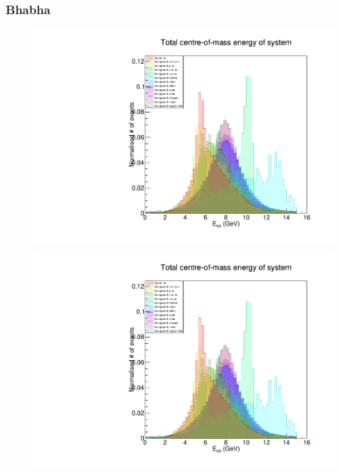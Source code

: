 \documentclass[12pt,a4paper]{article} %
\begin{document}
\subsubsection{Bhabha}

\begin{figure}[h]
\centering
\begin{minipage}{.5\textwidth}
  \centering
  \includegraphics[width=\linewidth]{images/stack/stack_cut6_totalCM_E.pdf}
  \label{fig:test1}
\end{minipage}%
\begin{minipage}{.5\textwidth}
  \centering
  \includegraphics[width=\linewidth]{images/stack/stack_cut6_totalCM_E.pdf}
  \label{fig:test2}
\end{minipage}
\end{figure}
\end{document}
